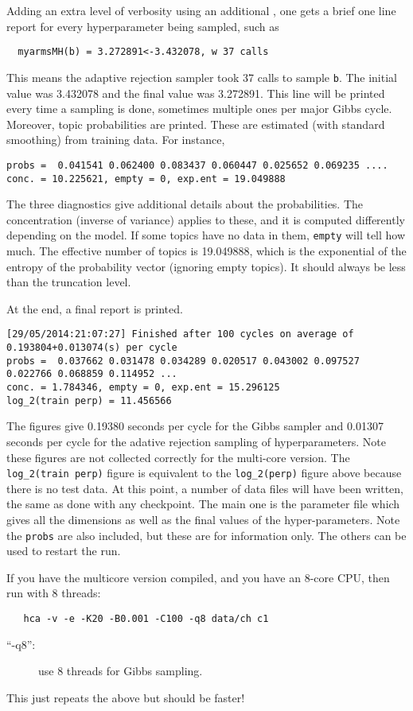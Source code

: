 \documentclass[a4paper,english]{article}
\begin{document}
Adding an extra level of verbosity using an additional , one gets
a brief one line report for every hyperparameter being sampled,
such as
\begin{verbatim}
  myarmsMH(b) = 3.272891<-3.432078, w 37 calls 
\end{verbatim}
This means the adaptive rejection sampler took 37 calls
to sample \texttt{b}.  The initial value was 3.432078
and the final value was 3.272891.
This line will be printed every time a sampling is done, sometimes multiple
ones per major Gibbs cycle.
Moreover, topic probabilities are printed.
These are estimated (with standard smoothing) from
training data.  For instance,
\begin{verbatim}
probs =  0.041541 0.062400 0.083437 0.060447 0.025652 0.069235 ....
conc. = 10.225621, empty = 0, exp.ent = 19.049888
\end{verbatim}
The three diagnostics give additional details about the probabilities.
The concentration (inverse of variance) applies to these,
and it is computed differently depending on the model.
If some topics have no data in them, \texttt{empty} will tell how much.
The effective number of topics is 19.049888,
which is the exponential of the entropy of the probability vector
(ignoring empty topics).
It should always be less than the truncation level.

At the end, a final report is printed.  
\begin{verbatim}
[29/05/2014:21:07:27] Finished after 100 cycles on average of 0.193804+0.013074(s) per cycle
probs =  0.037662 0.031478 0.034289 0.020517 0.043002 0.097527 0.022766 0.068859 0.114952 ...
conc. = 1.784346, empty = 0, exp.ent = 15.296125
log_2(train perp) = 11.456566
\end{verbatim}
The figures give 0.19380 seconds per cycle for the Gibbs sampler
and 0.01307 seconds per cycle for the adative rejection sampling
of hyperparameters.  Note these figures are not collected
correctly for the multi-core version.
The \texttt{log\_2(train perp)} figure is equivalent
to the \texttt{log\_2(perp)} figure 
above because there is no test data.
At this point, a number of data files will have been
written, the same as done with any checkpoint.
The main one is the parameter file
 which gives all the dimensions as well
as the final values of the hyper-parameters.
Note the \texttt{probs} are also included, but these
are for information only.
The others can be used to restart the run.

If you have the multicore version compiled, 
and you have an 8-core CPU, then run with 8 threads:
\begin{verbatim}
   hca -v -e -K20 -B0.001 -C100 -q8 data/ch c1
\end{verbatim}
\begin{description}
\item[``-q8'':] use 8 threads for Gibbs sampling.
\end{description}
This just repeats the above but should be faster!
\end{document}
